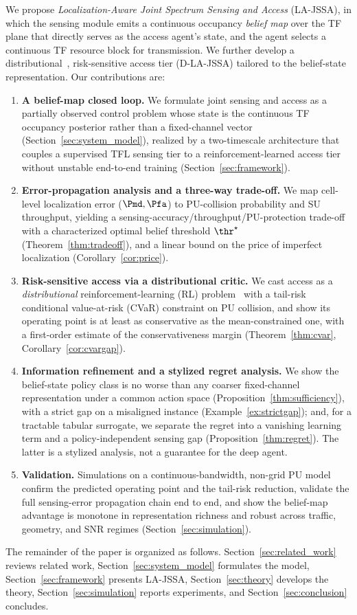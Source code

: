We propose \emph{Localization-Aware Joint Spectrum Sensing and Access}
(LA-JSSA), in which the sensing module emits a continuous occupancy
\emph{belief map} over the TF plane that directly serves as the access
agent's state, and the agent selects a continuous TF resource block for
transmission. We further develop a distributional~\cite{dabney2018qrdqn}, risk-sensitive access tier
(D-LA-JSSA) tailored to the belief-state representation. Our contributions
are:
\begin{enumerate}
\item \textbf{A belief-map closed loop.} We formulate joint sensing and
access as a partially observed control problem whose state is the continuous TF occupancy
posterior rather than a fixed-channel vector
(Section~\ref{sec:system_model}), realized by a two-timescale architecture
that couples a supervised TFL sensing tier to a reinforcement-learned access
tier without unstable end-to-end training (Section~\ref{sec:framework}).
\item \textbf{Error-propagation analysis and a three-way trade-off.} We map
cell-level localization error ($\Pmd,\Pfa$) to PU-collision probability and
SU throughput, yielding a sensing-accuracy/throughput/PU-protection
trade-off with a characterized optimal belief threshold $\thr^\star$
(Theorem~\ref{thm:tradeoff}), and a linear bound on the price of imperfect
localization (Corollary~\ref{cor:price}).
\item \textbf{Risk-sensitive access via a distributional critic.} We cast
access as a \emph{distributional} reinforcement-learning (RL)
problem~\cite{dabney2018qrdqn,ma2020dsac} with a tail-risk conditional
value-at-risk (CVaR) constraint on PU collision, and show its operating point is at least as
conservative as the mean-constrained one, with a first-order estimate of the
conservativeness margin (Theorem~\ref{thm:cvar},
Corollary~\ref{cor:cvargap}).
\item \textbf{Information refinement and a stylized regret analysis.} We show
the belief-state policy class is no worse than any coarser fixed-channel
representation under a common action space
(Proposition~\ref{thm:sufficiency}), with a strict gap on a misaligned
instance (Example~\ref{ex:strictgap}); and, for a tractable tabular
surrogate, we separate the regret into a vanishing learning term and a
policy-independent sensing gap (Proposition~\ref{thm:regret}). The latter is a
stylized analysis, not a guarantee for the deep agent.
\item \textbf{Validation.} Simulations on a continuous-bandwidth, non-grid
PU model confirm the predicted operating point and the tail-risk reduction,
validate the full sensing-error propagation chain end to end, and show the
belief-map advantage is monotone in representation richness and robust across
traffic, geometry, and SNR regimes (Section~\ref{sec:simulation}).
\end{enumerate}
The remainder of the paper is organized as follows.
Section~\ref{sec:related_work} reviews related work,
Section~\ref{sec:system_model} formulates the model,
Section~\ref{sec:framework} presents LA-JSSA,
Section~\ref{sec:theory} develops the theory,
Section~\ref{sec:simulation} reports experiments, and
Section~\ref{sec:conclusion} concludes.
